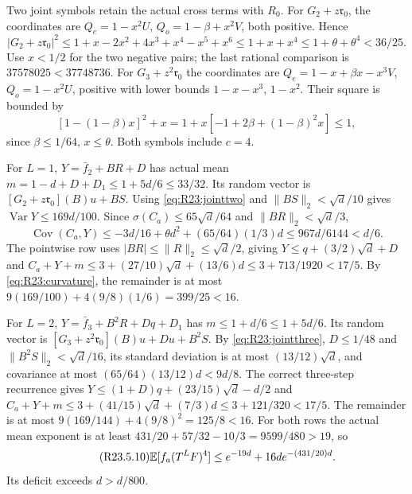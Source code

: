 Two joint symbols retain the actual cross terms with $R_0$.
For $G_2+z\mathfrak r_0$, the coordinates are
$Q_e=1-x^2U$, $Q_o=1-\beta+x^2V$, both positive. Hence
\begin{equation}\tag{R23.4.1}\label{eq:R23:jointtwo}
|G_2+z\mathfrak r_0|^2
\le1+x-2x^2+4x^3+x^4-x^5+x^6
\le1+x+x^4\le1+\theta+\theta^4<36/25.
\end{equation}
Use $x<1/2$ for the two negative pairs; the last rational comparison
is $37578025<37748736$.
For $G_3+z^2\mathfrak r_0$ the coordinates are
$Q_e=1-x+\beta x-x^3V$, $Q_o=1-x^2U$, positive with lower
bounds $1-x-x^3$, $1-x^2$. Their square is bounded by
\begin{equation}\tag{R23.4.2}\label{eq:R23:jointthree}
[1-(1-\beta)x]^2+x
=1+x[-1+2\beta+(1-\beta)^2x]\le1,
\end{equation}
since $\beta\le1/64$, $x\le\theta$. Both symbols include $c=4$.

For $L=1$, $Y=\bar f_2+BR+D$ has actual mean
$m=1-d+D+D_1\le1+5d/6\le33/32$.
Its random vector is $[G_2+z\mathfrak r_0](B)u+BS$.
Using \eqref{eq:R23:jointtwo} and $\|BS\|_2<\sqrt d/10$ gives
$\operatorname{Var}Y\le169d/100$.
Since $\sigma(C_a)\le65\sqrt d/64$ and $\|BR\|_2<\sqrt d/3$,
\[
\operatorname{Cov}(C_a,Y)
\le-3d/16+\theta d^2+(65/64)(1/3)d
\le967d/6144<d/6.
\]
The pointwise row uses $|BR|\le\|R\|_2\le\sqrt d/2$, giving
$Y\le q+(3/2)\sqrt d+D$ and
$C_a+Y+m\le3+(27/10)\sqrt d+(13/6)d
\le3+713/1920<17/5$.
By \eqref{eq:R23:curvature}, the remainder is at most
$9(169/100)+4(9/8)(1/6)=399/25<16$.

For $L=2$, $Y=\bar f_3+B^2R+Dq+D_1$ has
$m\le1+d/6\le1+5d/6$.
Its random vector is $[G_3+z^2\mathfrak r_0](B)u+Du+B^2S$.
By \eqref{eq:R23:jointthree}, $D\le1/48$ and
$\|B^2S\|_2<\sqrt d/16$, its standard deviation is at most
$(13/12)\sqrt d$, and covariance at most
$(65/64)(13/12)d<9d/8$.
The correct three-step recurrence gives
$Y\le(1+D)q+(23/15)\sqrt d-d/2$ and
$C_a+Y+m\le3+(41/15)\sqrt d+(7/3)d
\le3+121/320<17/5$.
The remainder is at most
$9(169/144)+4(9/8)^2=125/8<16$.
For both rows the actual mean exponent is at least
$431/20+57/32-10/3=9599/480>19$, so
\begin{equation}\tag{R23.5.10}\label{eq:R23:shortpayment}
\mathbb E[f_a(T^LF)^4]\le e^{-19d}+16de^{-(431/20)d}.
\end{equation}
Its deficit exceeds $d>d/800$.


